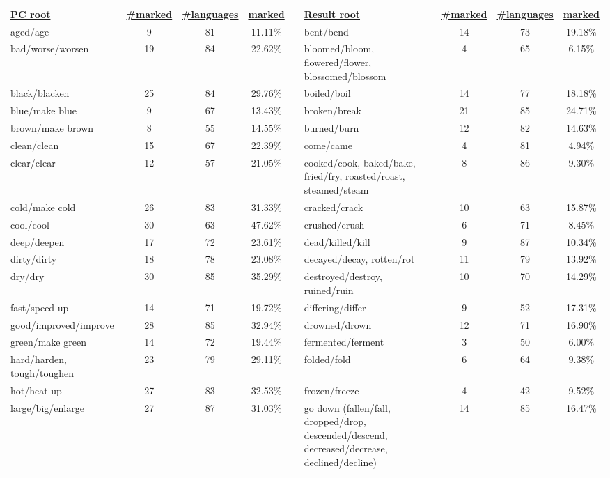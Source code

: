 \begin{tabular}{p{3cm}ccccp{3cm}ccc}
\underline{\textbf{PC root}} & \underline{\textbf{\#marked}} & \underline{\textbf{\#languages}} & \underline{\textbf{marked}} & & \underline{\textbf{Result root}} & \underline{\textbf{\#marked}} & \underline{\textbf{\#languages}} & \underline{\textbf{marked}} \\
aged/age & 9 & 81 & 11.11\% & & bent/bend & 14 & 73 & 19.18\% \\
bad/worse/worsen & 19 & 84 & 22.62\% & & bloomed/bloom, flowered/flower, blossomed/blossom & 4 & 65 & 6.15\% \\
black/blacken & 25 & 84 & 29.76\% & & boiled/boil & 14 & 77 & 18.18\% \\
blue/make blue & 9 & 67 & 13.43\% & & broken/break & 21 & 85 & 24.71\% \\
brown/make brown & 8 & 55 & 14.55\% & & burned/burn & 12 & 82 & 14.63\% \\
clean/clean & 15 & 67 & 22.39\% & & come/came & 4 & 81 & 4.94\% \\
clear/clear & 12 & 57 & 21.05\% & & cooked/cook, baked/bake, fried/fry, roasted/roast, steamed/steam & 8 & 86 & 9.30\% \\
cold/make cold & 26 & 83 & 31.33\% & & cracked/crack & 10 & 63 & 15.87\% \\
cool/cool & 30 & 63 & 47.62\% & & crushed/crush & 6 & 71 & 8.45\% \\
deep/deepen & 17 & 72 & 23.61\% & & dead/killed/kill & 9 & 87 & 10.34\% \\
dirty/dirty & 18 & 78 & 23.08\% & & decayed/decay, rotten/rot & 11 & 79 & 13.92\% \\
dry/dry & 30 & 85 & 35.29\% & & destroyed/destroy, ruined/ruin & 10 & 70 & 14.29\% \\
fast/speed up & 14 & 71 & 19.72\% & & differing/differ & 9 & 52 & 17.31\% \\
good/improved/improve & 28 & 85 & 32.94\% & & drowned/drown & 12 & 71 & 16.90\% \\
green/make green & 14 & 72 & 19.44\% & & fermented/ferment & 3 & 50 & 6.00\% \\
hard/harden, tough/toughen & 23 & 79 & 29.11\% & & folded/fold & 6 & 64 & 9.38\% \\
hot/heat up & 27 & 83 & 32.53\% & & frozen/freeze & 4 & 42 & 9.52\% \\
large/big/enlarge & 27 & 87 & 31.03\% & & go down (fallen/fall, dropped/drop, descended/descend, decreased/decrease, declined/decline) & 14 & 85 & 16.47\% \\

\end{tabular}
